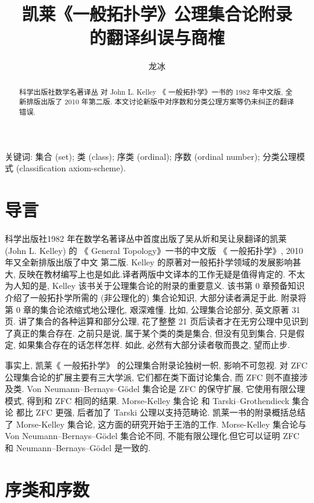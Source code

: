\documentclass[zihao=-4,a4paper]{ctexart}
\title{凯莱《一般拓扑学》公理集合论附录\\ 的翻译纠误与商榷}
\author{龙\quad 冰}
\date{}
\begin{document}
\maketitle
\begin{abstract}
科学出版社数学名著译丛 对 John L. Kelley 《 一般拓扑学》一书的 1982 年中文版, 全新排版出版了 2010 年第二版.
本文讨论新版中对序数和分类公理方案等仍未纠正的翻译错误.
\end{abstract}
	
关键词: 集合 (set); 类 (class); 序类 (ordinal); 
	序数 (ordinal number); 
	分类公理模式 (classification axiom-scheme).
	
	
	
\section{导言}
科学出版社1982 年在数学名著译丛中首度出版了吴从炘和吴让泉翻译的凯莱  (John L. Kelley) 的 《 General  Topology》\cite{jkelley1975}一书的中文版 《 一般拓扑学》, 2010 年又全新排版出版了中文 第二版\cite{jkelley2010zh}. Kelley 的原著对一般拓扑学领域的发展影响甚大, 反映在教材编写上也是如此\cite{PuJiangHu1985}.译者两版中文译本的工作无疑是值得肯定的. 不太为人知的是, Kelley 该书关于公理集合论的附录的重要意义. 该书第 0 章预备知识介绍了一般拓扑学所需的 (非公理化的) 集合论知识, 大部分读者满足于此. 
附录将第 0 章的集合论浓缩式地公理化, 艰深难懂. 比如, 公理集合论部分, 英文原著 31 页. 讲了集合的各种运算和部分公理, 花了整整 21 页后读者才在无穷公理中见识到了真正的集合存在. 之前只是说, 属于某个类的类是集合, 但没有见到集合, 只是假定, 如果集合存在的话怎样怎样. 如此, 必然有大部分读者敬而畏之, 望而止步. 

事实上, 凯莱《 一般拓扑学》 的公理集合附录论独树一帜, 影响不可忽视. 对 ZFC 公理集合论\cite{jjiang1991}\cite{enderton1977}的扩展主要有三大学派\cite{wikiSetTheory}, 它们都在类下面讨论集合, 而 ZFC 则不直接涉及类. Von Neumann–Bernays–Gödel 集合论\cite{wikiNBGSetTheory}是 ZFC 的保守扩展,  它使用有限公理模式, 得到和 ZFC 相同的结果. 
Morse-Kelley 集合论\cite{wikiMKSetTheory} 和 Tarski–Grothendieck 集合论\cite{wikiTGSetTheory} 都比 ZFC 更强, 后者加了 Tarski 公理以支持范畴论. 凯莱一书的附录概括总结了 Morse-Kelley 集合论,
这方面的研究开始于王浩的工作\cite{wang1949}. Morse-Kelley 集合论与 Von Neumann–Bernays–Gödel  集合论不同, 不能有限公理化.但它可以证明 ZFC 和 Neumann–Bernays–Gödel 是一致的.


	
\section{序类和序数 }
	
\end{document}
